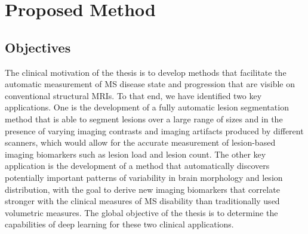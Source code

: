 % 

\section[Proposed method]{Proposed Method}

\subsection{Objectives}


The clinical motivation of the thesis is to develop methods that facilitate the
automatic measurement of MS disease state and progression that are visible on
conventional structural MRIs. To that end, we have identified two key
applications. One is the development of a fully automatic lesion segmentation
method that is able to segment lesions over a large range of sizes and in the
presence of varying imaging contrasts and imaging artifacts produced by
different scanners, which would allow for the accurate measurement of
lesion-based imaging biomarkers such as lesion load and lesion count. The other
key application is the development of a method that automatically discovers
potentially important patterns of variability in brain morphology and lesion
distribution, with the goal to derive new imaging biomarkers that correlate
stronger with the clinical measures of MS disability than traditionally used
volumetric measures. The global objective of the thesis is to determine the
capabilities of deep learning for these two clinical applications.

